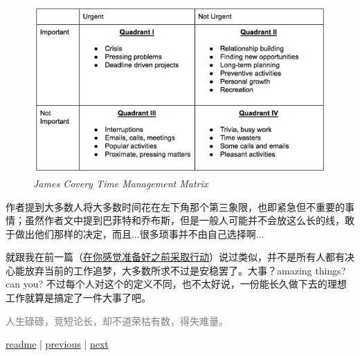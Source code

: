 \begin{figure}[htbp]
  \centering
    \includegraphics[width=\textwidth]{../images/2020/12/w6-share-1.png}
  \caption{\textit{James Covery Time Management Matrix}}
\end{figure}

作者提到大多数人将大多数时间花在左下角那个第三象限，也即紧急但不重要的事情；虽然作者文中提到巴菲特和乔布斯，但是一般人可能并不会放这么长的线，敢于做出他们那样的决定，而且...很多琐事并不由自己选择啊...

就跟我在前一篇（\hyperref[w5:share]{在你感觉准备好之前采取行动}）说过类似，并不是所有人都有决心能放弃当前的工作追梦，大多数所求不过是安稳罢了。大事？amazing things? can you? 不过每个人对这个的定义不同，也不太好说，一份能长久做下去的理想工作就算是搞定了一件大事了吧。

\begin{myquote}
\textcolor{gray}{人生碌碌，竞短论长，却不道荣枯有数，得失难量。}
\end{myquote}

\noindent \href{https://github.com/taseikyo/arts}{readme} | \hyperref[chap:w5]{previous} | \hyperref[chap:w7]{next}
